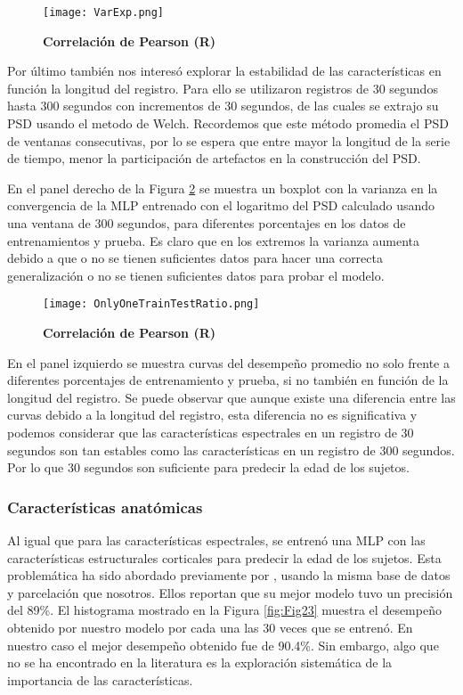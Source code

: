 \documentclass[11pt,letterpaper]{article}
\numberwithin{equation}{subsection}
\numberwithin{table}{subsection}
\begin{document}
\begin{figure}[H]
\centering
	\texttt{[image: VarExp.png]}
	\captionsetup{labelfont=bf}
	\caption{\scriptsize \textbf {Correlación de Pearson (R)} }
	\label{fig:Fig21}
\end{figure} 

\bigskip
\noindent Por último también nos interesó explorar la estabilidad de las características en función la longitud del registro. Para ello se utilizaron registros de 30 segundos hasta 300 segundos con incrementos de 30 segundos, de las cuales se extrajo su PSD usando el metodo de Welch. Recordemos que este método promedia el PSD de ventanas consecutivas, por lo se espera que entre mayor la longitud de la serie de tiempo, menor la participación de artefactos en la construcción del PSD. 

\bigskip
\noindent En el panel derecho de la Figura \ref{fig:Fig22} se muestra un boxplot con la varianza en la convergencia de la MLP entrenado con el logaritmo del PSD calculado usando una ventana de 300 segundos, para diferentes porcentajes en los datos de entrenamientos y prueba. Es claro que en los extremos la varianza aumenta debido a que o no se tienen suficientes datos para hacer una correcta generalización o no se tienen suficientes datos para probar el modelo. 

\begin{figure}[H]
\centering
	\texttt{[image: OnlyOneTrainTestRatio.png]}
	\captionsetup{labelfont=bf}
	\caption{\scriptsize \textbf {Correlación de Pearson (R)} }
	\label{fig:Fig22}
\end{figure} 

\bigskip
\noindent En el panel izquierdo se muestra curvas del desempeño promedio no solo frente a diferentes porcentajes de entrenamiento y prueba, si no también en función de la longitud del registro. Se puede observar que aunque existe una diferencia entre las curvas debido a la longitud del registro, esta diferencia no es significativa y podemos considerar que las características espectrales en un registro de 30 segundos son tan estables como las características en un registro de 300 segundos. Por lo que 30 segundos son suficiente para predecir la edad de los sujetos.

\subsubsection{Características anatómicas}

\noindent Al igual que para las características espectrales, se entrenó una MLP con las características estructurales corticales para predecir la edad de los sujetos. Esta problemática ha sido abordado previamente por \cite{han2022brain}, usando la misma base de datos y parcelación que nosotros. Ellos reportan que su mejor modelo tuvo un precisión del 89\%. El histograma mostrado en la Figura \ref{fig:Fig23} muestra el desempeño obtenido por nuestro modelo por cada una las 30 veces que se entrenó. En nuestro caso el mejor desempeño obtenido fue de 90.4\%. Sin embargo, algo que no se ha encontrado en la literatura es la exploración sistemática de la importancia de las características. 
\end{document}
